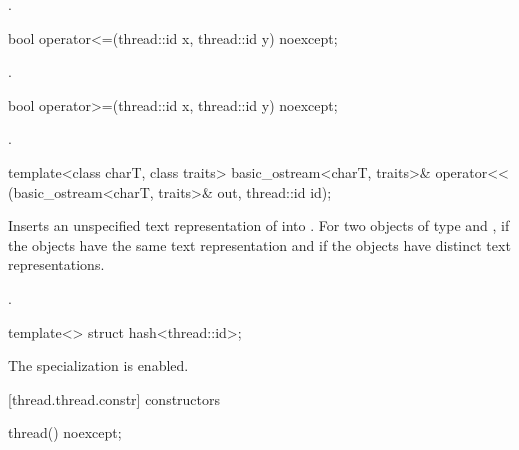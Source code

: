 \begin{itemdescr}
\pnum\returns {}.
\end{itemdescr}

%
\begin{itemdecl}
bool operator<=(thread::id x, thread::id y) noexcept;
\end{itemdecl}

\begin{itemdescr}
\pnum
\returns {}.
\end{itemdescr}

%
\begin{itemdecl}
bool operator>=(thread::id x, thread::id y) noexcept;
\end{itemdecl}

\begin{itemdescr}
\pnum\returns {}.
\end{itemdescr}

%
\begin{itemdecl}
template<class charT, class traits>
  basic_ostream<charT, traits>&
    operator<< (basic_ostream<charT, traits>& out, thread::id id);
\end{itemdecl}

\begin{itemdescr}
\pnum\effects Inserts an unspecified text representation of  into
. For two objects of type   and ,
if  the  objects have the same text
representation and if  the  objects have
distinct text representations.

\pnum\returns {}.
\end{itemdescr}

%
\begin{itemdecl}
template<> struct hash<thread::id>;
\end{itemdecl}

\begin{itemdescr}
\pnum The specialization is enabled.
\end{itemdescr}

[thread.thread.constr]{ constructors}

%
\begin{itemdecl}
thread() noexcept;
\end{itemdecl}

